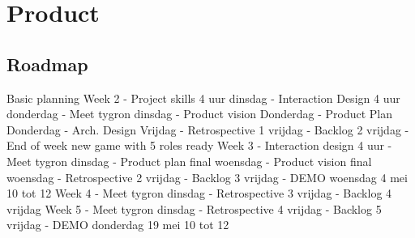 \label{product}
\section{Product}

\subsection{Roadmap}
Basic planning \newline
Week 2 \newline
-          Project skills 4 uur dinsdag \newline 
-          Interaction Design 4 uur donderdag \newline
\newline
-          Meet tygron dinsdag \newline
-          Product vision Donderdag\newline
-          Product Plan Donderdag\newline
-          Arch. Design Vrijdag\newline
-          Retrospective 1 vrijdag\newline
-          Backlog 2 vrijdag\newline
\newline
-          End of week new game with 5 roles ready\newline
\newline
Week 3\newline
-          Interaction design 4 uur\newline
\newline
-          Meet tygron dinsdag\newline
-          Product plan final woensdag\newline
-          Product vision final woensdag\newline
-          Retrospective 2 vrijdag\newline
-          Backlog 3 vrijdag\newline
\newline
-          DEMO woensdag 4 mei 10 tot 12\newline
Week 4\newline
-          Meet tygron dinsdag\newline
-          Retrospective 3 vrijdag\newline
-          Backlog 4 vrijdag\newline
\newline
Week 5\newline
-          Meet tygron dinsdag\newline
-          Retrospective 4 vrijdag\newline
-          Backlog 5 vrijdag\newline
\newline
-          DEMO donderdag 19 mei 10 tot 12\newline
\newline


